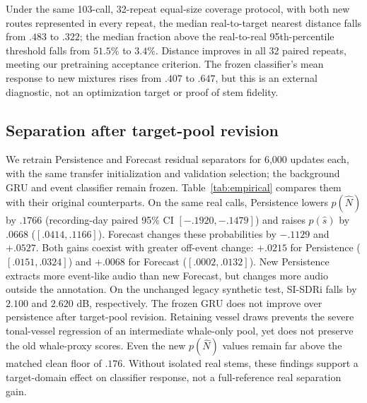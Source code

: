 \documentclass[conference]{IEEEtran}
\begin{document}
Under the same 103-call, 32-repeat equal-size coverage protocol, with both
new routes represented in every repeat, the median real-to-target nearest
distance falls from $.483$ to $.322$;
the median fraction above the real-to-real 95th-percentile threshold falls
from $51.5\%$ to $3.4\%$. Distance improves in all 32 paired repeats,
meeting our pretraining acceptance criterion. The frozen classifier's mean
response to new mixtures rises from $.407$ to $.647$, but this is an external
diagnostic, not an optimization target or proof of stem fidelity.

\subsection{Separation after target-pool revision}
We retrain Persistence and Forecast residual separators for 6,000 updates
each, with the same transfer initialization and validation selection; the
background GRU and event classifier remain frozen. Table~\ref{tab:empirical}
compares them with their original counterparts. On the same real calls,
Persistence lowers $p(\hat N)$ by $.1766$ (recording-day paired 95\% CI
$[-.1920,-.1479]$) and raises $p(\hat s)$ by $.0668$
($[.0414,.1166]$). Forecast changes these probabilities by $-.1129$
and $+.0527$. Both gains coexist with greater off-event change:
$+.0215$ for Persistence ($[.0151,.0324]$) and $+.0068$ for Forecast
($[.0002,.0132]$). New Persistence extracts more event-like audio than new
Forecast, but changes more audio outside the annotation. On the unchanged
legacy synthetic test, SI-SDRi falls by $2.100$ and $2.620$ dB, respectively.
The frozen GRU does not improve over persistence after target-pool revision.
Retaining vessel draws prevents the severe tonal-vessel regression of an
intermediate whale-only pool, yet does not preserve the old whale-proxy scores.
Even the new $p(\hat N)$ values remain far above the matched clean floor
of $.176$. Without isolated real stems, these findings support a target-domain
effect on classifier response, not a full-reference real separation gain.
\end{document}
